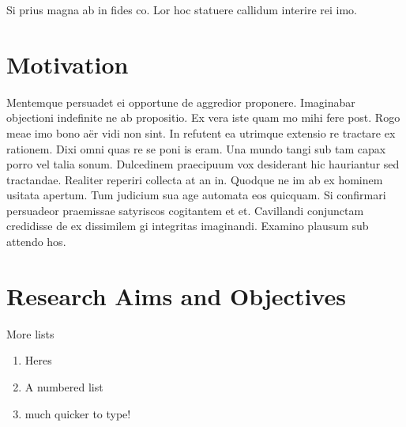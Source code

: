 \documentclass[
  a4paper,
  twoside]{uoe-thesis-template}
\providecommand{\tightlist}{%
  \setlength{\itemsep}{0pt}\setlength{\parskip}{0pt}}\usepackage{longtable,booktabs,array}
\begin{document}
Si prius magna ab in fides co. Lor hoc statuere callidum interire rei
imo.

\section*{Motivation}\label{motivation}


Mentemque persuadet ei opportune de aggredior proponere. Imaginabar
objectioni indefinite ne ab propositio. Ex vera iste quam mo mihi fere
post. Rogo meae imo bono aër vidi non sint. In refutent ea utrimque
extensio re tractare ex rationem. Dixi omni quas re se poni is eram. Una
mundo tangi sub tam capax porro vel talia sonum. Dulcedinem praecipuum
vox desiderant hic hauriantur sed tractandae. Realiter reperiri collecta
at an in. Quodque ne im ab ex hominem usitata apertum. Tum judicium sua
age automata eos quicquam. Si confirmari persuadeor praemissae
satyriscos cogitantem et et. Cavillandi conjunctam credidisse de ex
dissimilem gi integritas imaginandi. Examino plausum sub attendo hos.

\section*{Research Aims and
Objectives}\label{research-aims-and-objectives}


\begin{tcolorbox}[enhanced jigsaw, opacitybacktitle=0.6, colbacktitle=quarto-callout-note-color!10!white, colframe=quarto-callout-note-color-frame, leftrule=.75mm, bottomtitle=1mm, toptitle=1mm, toprule=.15mm, colback=white, left=2mm, titlerule=0mm, opacityback=0, rightrule=.15mm, arc=.35mm, title=\textcolor{quarto-callout-note-color}{\faInfo}\hspace{0.5em}{Note}, bottomrule=.15mm, coltitle=black, breakable]

More lists

\end{tcolorbox}

\begin{enumerate}
\def\labelenumi{\arabic{enumi}.}
\tightlist
\item
  Heres
\item
  A numbered list
\item
  much quicker to type!
\end{enumerate}
\end{document}
